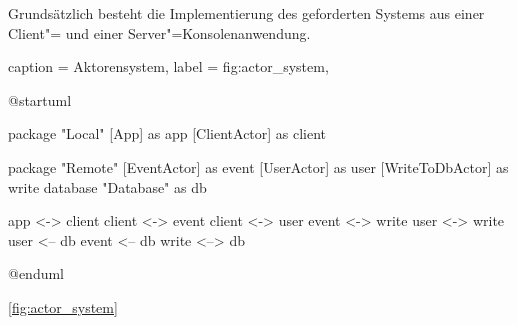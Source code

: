 Grundsätzlich besteht die Implementierung des geforderten Systems aus einer Client"= und einer Server"=Konsolenanwendung.

\begin{dhbwfigure}{%
    caption	= Aktorensystem,
    label	= fig:actor_system,
}
\begin{plantuml}
@startuml

package "Local" {
    [App] as app
    [ClientActor] as client
}

package "Remote" {
    [EventActor] as event
    [UserActor] as user
    [WriteToDbActor] as write
    database "Database" as db
}

app <-> client
client <-> event
client <-> user
event <-> write
user <-> write
user <-- db
event <-- db
write <--> db

@enduml
\end{plantuml}
\end{dhbwfigure}

\autoref{fig:actor_system}

